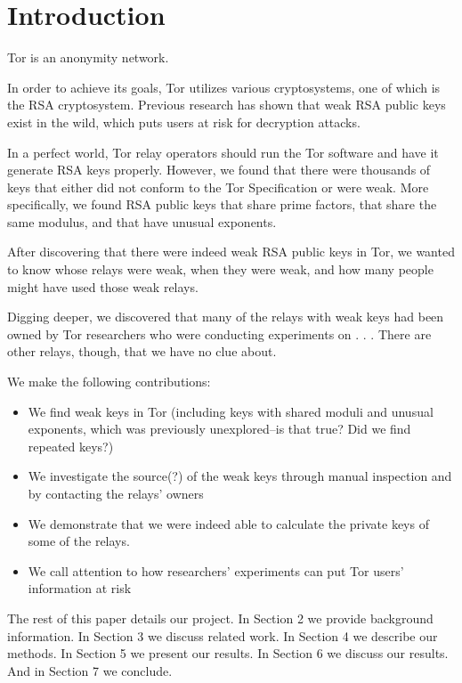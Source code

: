 \section{Introduction}
Tor is an anonymity network.  

In order to achieve its goals, Tor utilizes various cryptosystems, 
one of which is the RSA cryptosystem.  Previous research has 
shown that weak RSA public keys exist in the wild, which puts users at 
risk for decryption attacks.  

In a perfect world, Tor relay operators should run the Tor software and have it 
generate RSA keys properly. However, we found that there were thousands of keys 
that either did not conform to the Tor Specification or were weak.  More 
specifically, we found RSA public keys that share prime factors, 
that share the same modulus, and that have unusual exponents.

After discovering that there were indeed weak RSA public keys in Tor, we wanted 
to know whose relays were weak, when they were weak, and how many people might 
have used those weak relays.

Digging deeper, we discovered that many of the relays with weak keys had been owned 
by Tor researchers who were conducting experiments on . . . There are other 
relays, though, that we have no clue about.

We make the following contributions:
\begin{itemize}
  \item We find weak keys in Tor (including keys with shared moduli 
    and unusual exponents, which was previously unexplored--is that true?
    Did we find repeated keys?)
  \item We investigate the source(?) of the weak keys through manual inspection and by 
    contacting the relays' owners
  \item We demonstrate that we were indeed able to calculate the private keys of 
    some of the relays.
  \item We call attention to how researchers' experiments can put Tor users'
    information at risk
\end{itemize}

The rest of this paper details our project.  
In Section 2 we provide background information.  In Section 3 we discuss 
related work.  In Section 4 we describe our methods.  In Section 5 we 
present our results.  In Section 6 we discuss our results.  And in Section 7 
we conclude.
